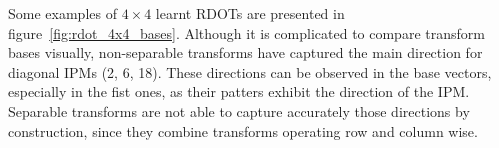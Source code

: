\documentclass[11pt,a4paper,openright,twoside]{book}
\numberwithin{equation}{section} %
\numberwithin{figure}{section} %
\numberwithin{table}{section} %
\begin{document}
Some examples of $4\times4$ learnt \acp{RDOT} are presented in
figure~\ref{fig:rdot_4x4_bases}.
Although it is complicated to compare transform bases visually, non-separable
transforms have captured the main direction for diagonal \acp{IPM} (2, 6, 18).
These directions can be observed in the base vectors, especially in the fist
ones, as their patters exhibit the direction of the \ac{IPM}.
Separable transforms are not able to capture accurately those directions by
construction, since they combine transforms operating row and column wise.

\begin{figure}[tb]
	\centering
	\hfill
	\hfill
	\hfill
	\hfill
	\\

\end{figure}
\end{document}
